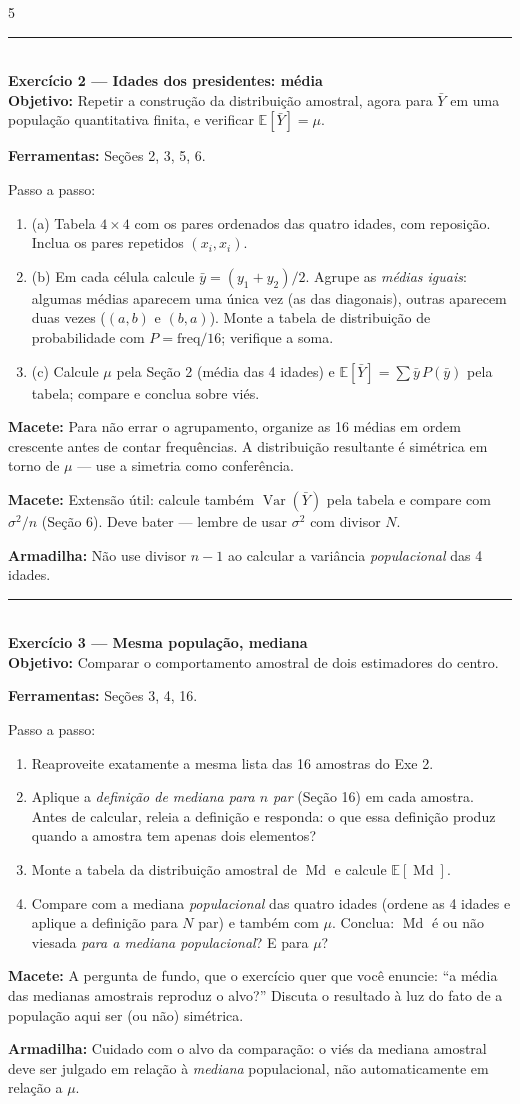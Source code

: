 \documentclass[a4paper,8pt]{extarticle}
\newcommand{\tit}[1]{\vspace{2pt}\textcolor{azul}{\rule{\linewidth}{0.6pt}}\\[1pt]\textbf{\textcolor{azul}{#1}}\\[1pt]}
\newcommand{\mac}[1]{\textcolor{verde}{\textbf{Macete:}} #1\par}
\newcommand{\arm}[1]{\textcolor{vinho}{\textbf{Armadilha:}} #1\par}
\newcommand{\ferr}[1]{\textbf{Ferramentas:} #1\par}
\newcommand{\obj}[1]{\textbf{Objetivo:} #1\par}
\newcommand{\E}{\mathbb{E}}
\newcommand{\Var}{\operatorname{Var}}
\newcommand{\Med}{\operatorname{Md}}
\begin{document}
\begin{multicols*}{5}
\tit{Exercício 2 — Idades dos presidentes: média}
\obj{Repetir a construção da distribuição amostral, agora para $\bar Y$ em uma população quantitativa finita, e verificar $\E[\bar Y]=\mu$.}
\ferr{Seções 2, 3, 5, 6.}
Passo a passo:
\begin{enumerate}
\item (a) Tabela $4\times4$ com os pares ordenados das quatro idades, com reposição. Inclua os pares repetidos $(x_i,x_i)$.
\item (b) Em cada célula calcule $\bar y=(y_1+y_2)/2$. Agrupe as \emph{médias iguais}: algumas médias aparecem uma única vez (as das diagonais), outras aparecem duas vezes ($(a,b)$ e $(b,a)$). Monte a tabela de distribuição de probabilidade com $P=\text{freq}/16$; verifique a soma.
\item (c) Calcule $\mu$ pela Seção 2 (média das 4 idades) e $\E[\bar Y]=\sum \bar y\,P(\bar y)$ pela tabela; compare e conclua sobre viés.
\end{enumerate}
\mac{Para não errar o agrupamento, organize as 16 médias em ordem crescente antes de contar frequências. A distribuição resultante é simétrica em torno de $\mu$ — use a simetria como conferência.}
\mac{Extensão útil: calcule também $\Var(\bar Y)$ pela tabela e compare com $\sigma^2/n$ (Seção 6). Deve bater — lembre de usar $\sigma^2$ com divisor $N$.}
\arm{Não use divisor $n-1$ ao calcular a variância \emph{populacional} das 4 idades.}

\tit{Exercício 3 — Mesma população, mediana}
\obj{Comparar o comportamento amostral de dois estimadores do centro.}
\ferr{Seções 3, 4, 16.}
Passo a passo:
\begin{enumerate}
\item Reaproveite exatamente a mesma lista das 16 amostras do Exe 2.
\item Aplique a \emph{definição de mediana para $n$ par} (Seção 16) em cada amostra. Antes de calcular, releia a definição e responda: o que essa definição produz quando a amostra tem apenas dois elementos?
\item Monte a tabela da distribuição amostral de $\Med$ e calcule $\E[\Med]$.
\item Compare com a mediana \emph{populacional} das quatro idades (ordene as 4 idades e aplique a definição para $N$ par) e também com $\mu$. Conclua: $\Med$ é ou não viesada \emph{para a mediana populacional}? E para $\mu$?
\end{enumerate}
\mac{A pergunta de fundo, que o exercício quer que você enuncie: “a média das medianas amostrais reproduz o alvo?” Discuta o resultado à luz do fato de a população aqui ser (ou não) simétrica.}
\arm{Cuidado com o alvo da comparação: o viés da mediana amostral deve ser julgado em relação à \emph{mediana} populacional, não automaticamente em relação a $\mu$.}


\end{multicols*}
\end{document}
